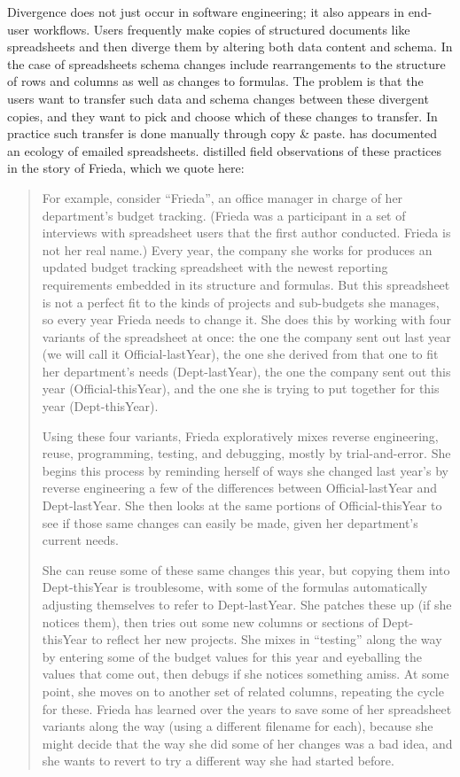 \documentclass[english,submission]{programming}
\begin{document}
Divergence does not just occur in software engineering; it also appears in end-user workflows. Users frequently make copies of structured documents like spreadsheets and then diverge them by altering both data content and schema. In the case of spreadsheets schema changes include rearrangements to the structure of rows and columns as well as changes to formulas. The problem is that the users want to transfer such data and schema changes between these divergent copies, and they want to pick and choose which of these changes to transfer. In practice such transfer is done manually through copy \& paste. \citet{Basman19} has documented an ecology of emailed spreadsheets. \citet{Burnett14} distilled field observations of these practices in the story of Frieda, which we quote here:

\begin{quotation}

For example, consider ``Frieda'', an office manager in charge of her department's budget tracking. (Frieda was a participant in a set of interviews with spreadsheet users that the first author conducted. Frieda is not her real name.) Every year, the company she works for produces an updated budget tracking spreadsheet with the newest reporting requirements embedded in its structure and formulas. But this spreadsheet is not a perfect fit to the kinds of projects and sub-budgets she manages, so every year Frieda needs to change it. She does this by working with four variants of the spreadsheet at once: the one the company sent out last year (we will call it Official-lastYear), the one she derived from that one to fit her department's needs (Dept-lastYear), the one the company sent out this year (Official-thisYear), and the one she is trying to put together for this year (Dept-thisYear).

Using these four variants, Frieda exploratively mixes reverse engineering, reuse, programming, testing, and debugging, mostly by trial-and-error. She begins this process by reminding herself of ways she changed last year's by reverse engineering a few of the differences between Official-lastYear and Dept-lastYear. She then looks at the same portions of Official-thisYear to see if those same changes can easily be made, given her department's current needs.

She can reuse some of these same changes this year, but copying them into Dept-thisYear is troublesome, with some of the formulas automatically adjusting themselves to refer to Dept-lastYear. She patches these up (if she notices them), then tries out some new columns or sections of Dept-thisYear to reflect her new projects. She mixes in ``testing'' along the way by entering some of the budget values for this year and eyeballing the values that come out, then debugs if she notices something amiss. At some point, she moves on to another set of related columns, repeating the cycle for these. Frieda has learned over the years to save some of her spreadsheet variants along the way (using a different filename for each), because she might decide that the way she did some of her changes was a bad idea, and she wants to revert to try a different way she had started before.
\end{quotation}
\end{document}
